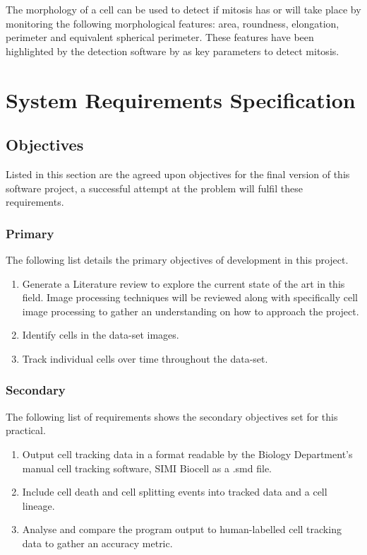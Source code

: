 \documentclass[12pt a4paper]{article}
\begin{document}
        The morphology of a cell can be used to detect if mitosis has or will take place by monitoring the following morphological features: area, roundness, elongation, perimeter and equivalent spherical perimeter. These features have been highlighted by the detection software by \cite{irshad2013automated} as key parameters to detect mitosis.
        
        
\newpage
\section{System Requirements Specification}
\subsection{Objectives}
Listed in this section are the agreed upon objectives for the final version of this software project, a successful attempt at the problem will fulfil these requirements.
\subsubsection{Primary}
The following list details the primary objectives of development in this project.
\begin{enumerate}
  \item Generate a Literature review to explore the current state of the art in this field. Image processing techniques will be reviewed along with specifically cell image processing to gather an understanding on how to approach the project.
  \item Identify cells in the data-set images.
  \item Track individual cells over time throughout the data-set.
\end{enumerate}


\subsubsection{Secondary}
The following list of requirements shows the secondary objectives set for this practical.

\begin{enumerate}
    \item Output cell tracking data in a format readable by the Biology Department's manual cell tracking software, SIMI Biocell as a .smd file.
    \item Include cell death and cell splitting events into tracked data and a cell lineage.
    \item Analyse and compare the program output to human-labelled cell tracking data to gather an accuracy metric.
\end{enumerate}
\end{document}
